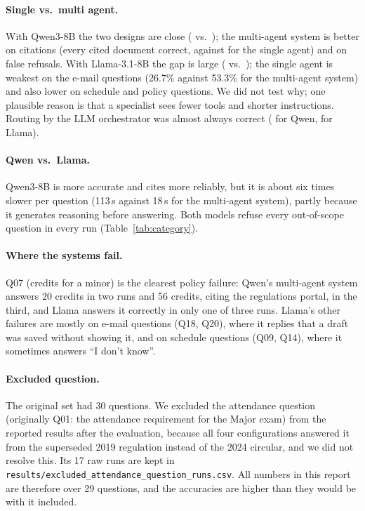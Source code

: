 \documentclass[11pt,a4paper]{article}
\begin{document}
\paragraph{Single vs.\ multi agent.} With Qwen3-8B the two designs are close (\accMultiQwen{} vs.\
\accSingleQwen{}); the multi-agent system is better on citations (every cited document correct, against
\correctSrcSingleQwen{} for the single agent) and on false refusals. With Llama-3.1-8B the gap is large
(\accMultiLlama{} vs.\ \accSingleLlama{}); the single agent is weakest on the e-mail questions
(26.7\% against 53.3\% for the multi-agent system) and also lower on schedule and policy questions. We did not
test why; one plausible reason is that a specialist sees fewer tools and shorter instructions. Routing by the LLM orchestrator was almost always correct (\routingMultiQwen{} for Qwen,
\routingMultiLlama{} for Llama).

\paragraph{Qwen vs.\ Llama.} Qwen3-8B is more accurate and cites more reliably, but it is about six times
slower per question (113\,s against 18\,s for the multi-agent system), partly because it generates
reasoning before answering. Both models refuse every out-of-scope question in every run
(Table~\ref{tab:category}).

\paragraph{Where the systems fail.} Q07 (credits for a minor) is the clearest policy failure: Qwen's
multi-agent system answers 20 credits in two runs and 56 credits, citing the regulations portal, in the third,
and Llama answers it correctly in only one of three runs. Llama's other failures are mostly on e-mail questions
(Q18, Q20), where it replies that a draft was saved without showing it, and on schedule questions (Q09, Q14),
where it sometimes answers ``I don't know''.

\paragraph{Excluded question.} The original set had 30 questions. We excluded the attendance question (originally Q01: the attendance
requirement for the Major exam) from the reported results after the evaluation, because all four
configurations answered it from the superseded 2019 regulation instead of the 2024 circular, and we did not
resolve this. Its 17 raw runs are kept in \texttt{results/excluded\_attendance\_question\_runs.csv}. All numbers in this report
are therefore over 29 questions, and the accuracies are higher than they would be with it included.
\end{document}
